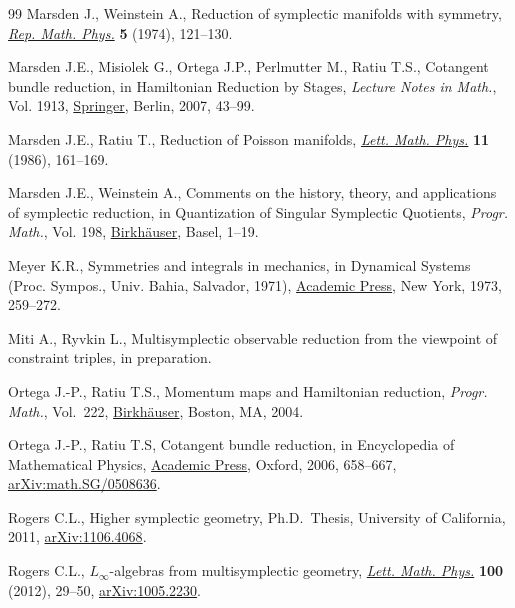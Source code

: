 \documentclass[10pt,a4paper]{amsart}
\numberwithin{equation}{section}
\begin{document}
\begin{thebibliography}{99}
Marsden J., Weinstein A., Reduction of symplectic manifolds with symmetry,
  \href{https://doi.org/10.1016/0034-4877(74)90021-4}{\textit{Rep. Math. Phys.}} \textbf{5} (1974), 121--130.

Marsden J.E., Misiolek G., Ortega J.P., Perlmutter M., Ratiu T.S., Cotangent
  bundle reduction, in Hamiltonian Reduction by Stages, \textit{Lecture Notes
  in Math.}, Vol. 1913, \href{https://doi.org/10.1007/978-3-540-72470-4_2}{Springer}, Berlin, 2007, 43--99.

Marsden J.E., Ratiu T., Reduction of {P}oisson manifolds, \href{https://doi.org/10.1007/BF00398428}{\textit{Lett. Math.
  Phys.}} \textbf{11} (1986), 161--169.

Marsden J.E., Weinstein A., Comments on the history, theory, and applications
  of symplectic reduction, in Quantization of Singular Symplectic Quotients,
  \textit{Progr. Math.}, Vol. 198, \href{https://doi.org/10.1007/978-3-0348-8364-1_1}{Birkh\"auser}, Basel, 1--19.

Meyer K.R., Symmetries and integrals in mechanics, in Dynamical Systems
  ({P}roc. {S}ympos., {U}niv. {B}ahia, {S}alvador, 1971), \href{https://doi.org/10.1016/B978-0-12-550350-1.50025-4}{Academic Press}, New
  York, 1973, 259--272.

Miti A., Ryvkin L., Multisymplectic observable reduction from the viewpoint of
  constraint triples, in preparation.

Ortega J.-P., Ratiu T.S., Momentum maps and {H}amiltonian reduction,
  \textit{Progr. Math.}, Vol.~222, \href{https://doi.org/10.1007/978-1-4757-3811-7}{Birkh\"auser}, Boston, MA, 2004.

Ortega J.-P., Ratiu T.S, Cotangent bundle reduction, in Encyclopedia of
  Mathematical Physics, \href{https://doi.org/10.1016/B0-12-512666-2/00501-0}{Academic Press}, Oxford, 2006, 658--667,
  \href{https://arxiv.org/abs/math.SG/0508636}{arXiv:math.SG/0508636}.

Rogers C.L., Higher symplectic geometry, Ph.D.~Thesis, {U}niversity of
  {C}alifornia, 2011, \href{https://arxiv.org/abs/1106.4068}{arXiv:1106.4068}.

Rogers C.L., $L_\infty$-algebras from multisymplectic geometry, \href{https://doi.org/10.1007/s11005-011-0493-x}{\textit{Lett.
  Math. Phys.}} \textbf{100} (2012), 29--50, \href{https://arxiv.org/abs/1005.2230}{arXiv:1005.2230}.


\end{thebibliography}
\end{document}
